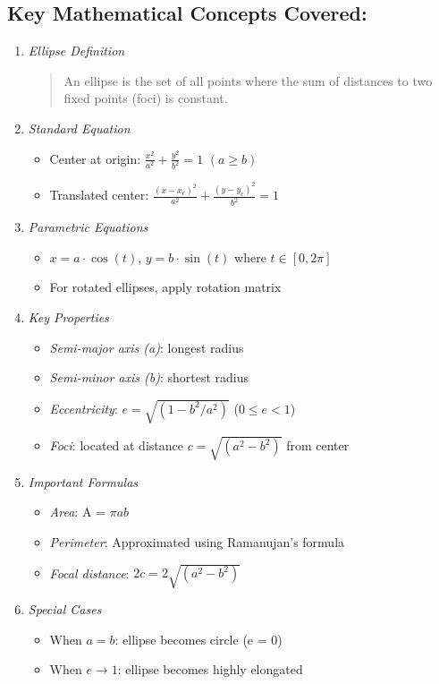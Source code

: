 \documentclass[a4paper,10pt]{article}
\begin{document}
\subsection{ Key Mathematical Concepts Covered:}
\begin{enumerate}
\item \emph{Ellipse Definition}
\begin{quote}
An ellipse is the set of all points where the sum of distances to two fixed points (foci) is constant.                                                                                                      \end{quote}
\item \emph{Standard Equation}
\begin{itemize}
\item Center at origin: \(\frac{x^2}{a^2} + \frac{y^2}{b^2} = 1\) \((a \geq b)\)
\item Translated center: \(\frac{(x-x_c)^2}{a^2} + \frac{(y-y_c)^2}{b^2} = 1\)
\end{itemize}
\item \emph{Parametric Equations}
\begin{itemize}
\item \(x = a\cdot\cos(t)\), \(y = b\cdot\sin(t)\) where \(t \in [0, 2\pi]\)
\item  For rotated ellipses, apply rotation matrix
\end{itemize}

\item \emph{Key Properties}
\begin{itemize}
\item \emph{Semi-major axis (a)}: longest radius
\item \emph{Semi-minor axis (b)}: shortest radius
\item \emph{Eccentricity}: \(e = \sqrt{(1 - b^2/a^2)}\) (\(0 \leq e < 1\))
\item \emph{Foci}: located at distance \(c = \sqrt{(a^2 - b^2)}\) from center
\end{itemize}

\item \emph{Important Formulas}
\begin{itemize}
\item \emph{Area}: A = \(\pi a b\)
\item \emph{Perimeter}: Approximated using Ramanujan's formula
\item \emph{Focal distance}: \( 2c = 2\sqrt{(a^2 - b^2)}\)
\end{itemize}
\item \emph{Special Cases}
\begin{itemize}
\item When \(a = b\): ellipse becomes circle (e = 0)
\item When \(e \rightarrow 1\): ellipse becomes highly elongated
\end{itemize}
\end{enumerate}
\end{document}
